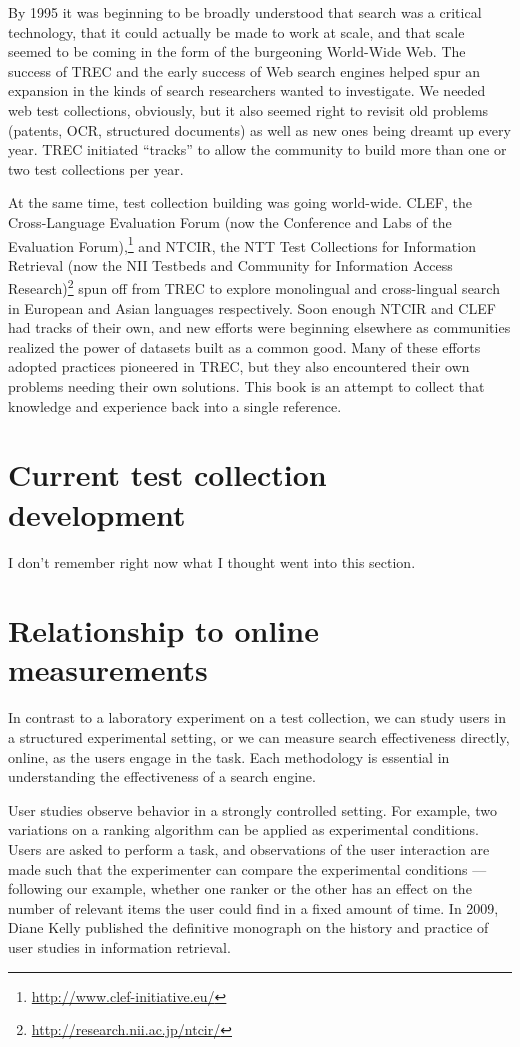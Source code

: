 \documentclass[nobib]{tufte-book}
\begin{document}
By 1995 it was beginning to be broadly understood that search was a critical technology, that it could actually be made to work at scale, and that scale seemed to be coming in the form of the burgeoning World-Wide Web.  The success of TREC and the early success of Web search engines helped spur an expansion in the kinds of search researchers wanted to investigate.  We needed web test collections, obviously, but it also seemed right to revisit old problems (patents, OCR, structured documents) as well as new ones being dreamt up every year.  TREC initiated ``tracks'' to allow the community to build more than one or two test collections per year.

At the same time, test collection building was going world-wide.  CLEF, the Cross-Language Evaluation Forum (now the Conference and Labs of the Evaluation Forum),\footnote{\url{http://www.clef-initiative.eu/}} and NTCIR, the NTT Test Collections for Information Retrieval (now the NII Testbeds and Community for Information Access Research)\footnote{\url{http://research.nii.ac.jp/ntcir/}} spun off from TREC to explore monolingual and cross-lingual search in European and Asian languages respectively.  Soon enough NTCIR and CLEF had tracks of their own, and new efforts were beginning elsewhere as communities realized the power of datasets built as a common good. Many of these efforts adopted practices pioneered in TREC, but they also encountered their own problems needing their own solutions.  This book is an attempt to collect that knowledge and experience back into a single reference.


\section{Current test collection development}

I don't remember right now what I thought went into this section.

\section{Relationship to online measurements}

In contrast to a laboratory experiment on a test collection, we can study users in a structured experimental setting, or we can measure search effectiveness directly, online, as the users engage in the task.  Each methodology is essential in understanding the effectiveness of a search engine.

User studies observe behavior in a strongly controlled setting.  For example, two variations on a ranking algorithm can be applied as experimental conditions.  Users are asked to perform a task, and observations of the user interaction are made such that the experimenter can compare the experimental conditions --- following our example, whether one ranker or the other has an effect on the number of relevant items the user could find in a fixed amount of time.  In 2009, Diane Kelly published the definitive monograph on the history and practice of user studies in information retrieval.\autocite{kelly_methods_2009}
\end{document}
